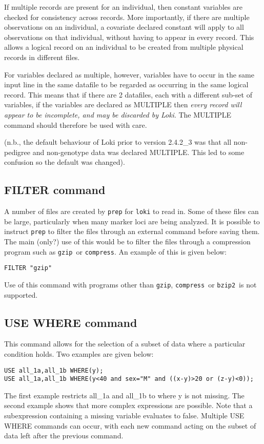 \documentclass[10pt,a4paper]{article}
\newcommand{\Prep}{\texttt{prep}\xspace}
\newcommand{\Loki}{\texttt{loki}\xspace}
\begin{document}
If multiple records are present for an individual, then constant variables
are checked for consistency across records.  More importantly, if there are
multiple observations on an individual, a covariate declared constant will
apply to all observations on that individual, without having to appear in
every record.  This allows a logical record on an individual to be created
from multiple physical records in different files.

For variables declared as multiple, however, variables have to occur in the
same input line in the same datafile to be regarded as occurring in the same
logical record.  This means that if there are 2 datafiles, each with a
different sub-set of variables, if the variables are declared as MULTIPLE
then \emph{every record will appear to be incomplete, and may be discarded
by Loki}.  The MULTIPLE command should therefore be used with care.

(n.b., the default behaviour of Loki prior to version 2.4.2\_3 was that all
non-pedigree and non-genotype data was declared MULTIPLE.  This led to some
confusion so the default was changed).

\subsection{FILTER command}
A number of files are created by \Prep for \Loki to read in.  Some of these
files can be large, particularly when many marker loci are being analyzed.  It
is possible to instruct \Prep to filter the files through an external
command before saving them.  The main (only?) use of this would be to filter
the files through a compression program such as \verb+gzip+\ or
\verb+compress+.  An example of this is given below:
\begin{verbatim}
FILTER "gzip"
\end{verbatim}
Use of this command with programs other than \verb+gzip+,
\verb+compress+\ or \verb+bzip2+\ is not supported.
\subsection{USE WHERE command}
This command allows for the selection of a subset of data where a particular
condition holds.  Two examples are given below:
\begin{verbatim}
USE all_1a,all_1b WHERE(y);
USE all_1a,all_1b WHERE(y<40 and sex="M" and ((x-y)>20 or (z-y)<0));
\end{verbatim}
The first example restricts all\_1a and all\_1b to where y is not missing. The
second example shows that more complex expressions are possible.  Note that a
subexpression containing a missing variable evaluates to false.  Multiple USE
WHERE commands can occur, with each new command acting on the subset of data
left after the previous command.
\end{document}
